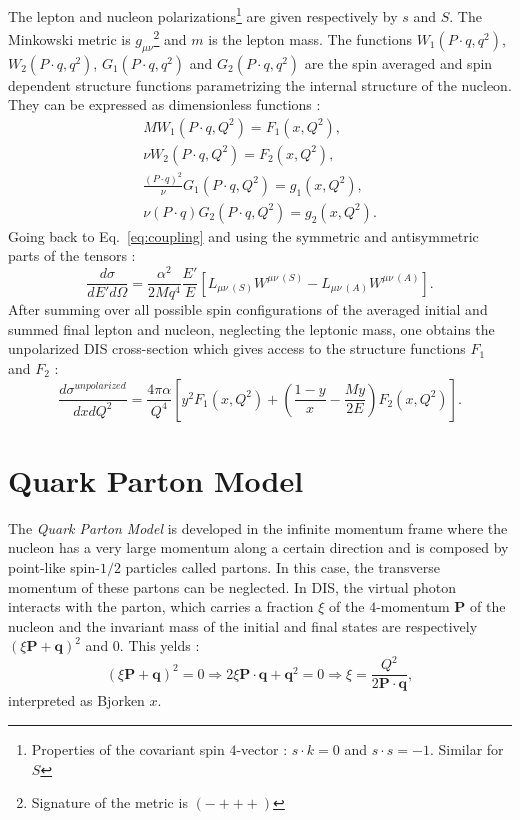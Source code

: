 The lepton and nucleon polarizations\footnote{Properties of the covariant spin $4$-vector : $s \cdot k = 0$ and $s \cdot s = -1$. Similar for $S$} are given respectively by $s$ and $S$. The Minkowski metric is $g_{\mu\nu}$\footnote{Signature of the metric is $(-+++)$} and $m$ is the lepton mass. The functions $W_1(P \cdot q,q^2)$, $W_2(P\cdot q,q^2)$, $G_1(P\cdot q,q^2)$ and $G_2(P\cdot q,q^2)$ are the spin averaged and spin dependent structure functions parametrizing the internal structure of the nucleon. They can be expressed as dimensionless functions :
%
\begin{equation}
  \begin{split}
    MW_1(P\cdot q,Q^2)=F_1(x,Q^2), \\
    \nu W_2(P\cdot q,Q^2)=F_2(x,Q^2), \\
    \frac{(P\cdot q)^2}{\nu}G_1(P\cdot q,Q^2)=g_1(x,Q^2), \\
    \nu(P\cdot q)G_2(P\cdot q,Q^2)=g_2(x,Q^2).
  \end{split}
  \label{eq:dimless}
\end{equation}
%
Going back to Eq.~\ref{eq:coupling} and using the symmetric and antisymmetric parts of the tensors :
%
\begin{equation}
  \frac{d\sigma}{dE'd\Omega} = \frac{\alpha^2}{2Mq^4}\frac{E'}{E}\left[L_{\mu\nu\ (S)}W^{\mu\nu\ (S)}-L_{\mu\nu\ (A)}W^{\mu\nu\ (A)}\right].
\end{equation}
%
After summing over all possible spin configurations of the averaged initial and summed final lepton and nucleon, neglecting the leptonic mass, one obtains the unpolarized DIS cross-section which gives access to the structure functions $F_1$ and $F_2$ :
%
\begin{equation}
  \frac{d\sigma^{unpolarized}}{dxdQ^2} = \frac{4\pi\alpha}{Q^4}\left[y^2F_1(x,Q^2)+\left(\frac{1-y}{x}-\frac{My}{2E}\right)F_2(x,Q^2)\right].
  \label{eq:unpolDIS}
\end{equation}


\section{Quark Parton Model}

The \textit{Quark Parton Model} \cite{Bjorken,Feynman} is developed in the infinite momentum frame where the nucleon has a very large momentum along a certain direction and is composed by point-like spin-$1/2$ particles called partons. In this case, the transverse momentum of these partons can be neglected. In DIS, the virtual photon interacts with the parton, which carries a fraction $\xi$ of the $4$-momentum \textbf{P} of the nucleon and the invariant mass of the initial and final states are respectively $(\xi\textbf{P}+\textbf{q})^2$ and $0$. This yelds :
%
\begin{equation}
  (\xi\textbf{P}+\textbf{q})^2 = 0 \Rightarrow 2\xi\textbf{P}\cdot\textbf{q}+\textbf{q}^2 = 0 \Rightarrow \xi = \frac{Q^2}{2\textbf{P}\cdot\textbf{q}},
\end{equation}
%
interpreted as Bjorken $x$.

